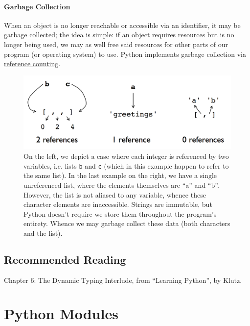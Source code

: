 \documentclass[12pt,letterpaper,twoside]{article}
\begin{document}
\begin{enumerate}
\paragraph{Garbage Collection}
When an object is no longer reachable or accessible via an identifier, it may be \href{https://en.wikipedia.org/wiki/Garbage_collection_(computer_science)}{garbage collected};
the idea is simple: if an object requires resources but is no longer being used, we may as well free said resources for other parts of our program (or operating system) to use. 
Python implements garbage collection via \href{https://en.wikipedia.org/wiki/Reference_counting#Use_in_garbage_collection}{reference counting}.

\begin{figure}[h]
\centering
\includegraphics[scale=0.35]{fig/gc-2.png}
\caption{\footnotesize On the left, we depict a case where each integer is referenced by two variables, i.e. 
lists \texttt{b} and \texttt{c} (which in this example happen to refer to the same list). In the last example on the right, we have a single 
unreferenced list, where the elements themselves are ``a'' and ``b''. However, the list is not aliased to any variable, whence these 
character elements are inaccessible. Strings are immutable, but Python doesn't require we store them throughout the program's entirety.
Whence we may garbage collect these data (both characters and the list).}
\end{figure}

\subsection{Recommended Reading}
Chapter 6: The Dynamic Typing Interlude, from ``Learning Python'', by Klutz.


\section{Python Modules}


\end{enumerate}
\end{document}
